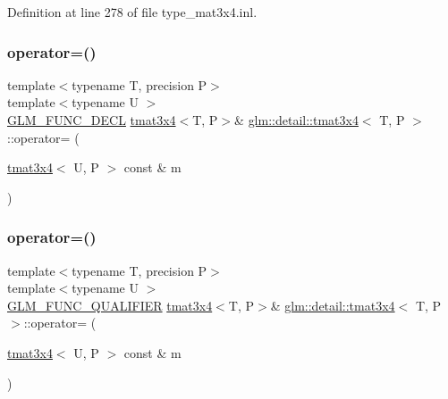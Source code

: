 Definition at line 278 of file type\+\_\+mat3x4.\+inl.

\mbox{\label{structglm_1_1detail_1_1tmat3x4_a3e6b142f80982e1d1722f75a6d146090}} 
\subsubsection{\texorpdfstring{operator=()}{operator=()}\hspace{0.1cm}{\footnotesize\ttfamily [2/3]}}
{\footnotesize\ttfamily template$<$typename T, precision P$>$ \\
template$<$typename U $>$ \\
\hyperlink{setup_8hpp_ab2d052de21a70539923e9bcbf6e83a51}{G\+L\+M\+\_\+\+F\+U\+N\+C\+\_\+\+D\+E\+CL} \hyperlink{structglm_1_1detail_1_1tmat3x4}{tmat3x4}$<$T, P$>$\& \hyperlink{structglm_1_1detail_1_1tmat3x4}{glm\+::detail\+::tmat3x4}$<$ T, P $>$\+::operator= (\begin{DoxyParamCaption}\item[{\hyperlink{structglm_1_1detail_1_1tmat3x4}{tmat3x4}$<$ U, P $>$ const \&}]{m }\end{DoxyParamCaption})}

\mbox{\label{structglm_1_1detail_1_1tmat3x4_aca5ba516f89ecc2713770dccad41578b}} 
\subsubsection{\texorpdfstring{operator=()}{operator=()}\hspace{0.1cm}{\footnotesize\ttfamily [3/3]}}
{\footnotesize\ttfamily template$<$typename T, precision P$>$ \\
template$<$typename U $>$ \\
\hyperlink{setup_8hpp_a33fdea6f91c5f834105f7415e2a64407}{G\+L\+M\+\_\+\+F\+U\+N\+C\+\_\+\+Q\+U\+A\+L\+I\+F\+I\+ER} \hyperlink{structglm_1_1detail_1_1tmat3x4}{tmat3x4}$<$T, P$>$\& \hyperlink{structglm_1_1detail_1_1tmat3x4}{glm\+::detail\+::tmat3x4}$<$ T, P $>$\+::operator= (\begin{DoxyParamCaption}\item[{\hyperlink{structglm_1_1detail_1_1tmat3x4}{tmat3x4}$<$ U, P $>$ const \&}]{m }\end{DoxyParamCaption})}



